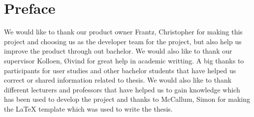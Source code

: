 \chapter*{Preface} %
\label{chap:preface}

We would like to thank our product owner Frantz, Christopher for making this project and choosing us as the developer team for the project, but also help us improve the product through out bachelor. We would also like to thank our supervisor Kolloen, Øivind for great help in academic writting. A big thanks to participants for user studies and other bachelor students that have helped us correct or shared information related to thesis. We would also like to thank different lecturers and professors that have helped us to gain knowledge which has been used to develop the project and thanks to McCallum, Simon for making the \LaTeX{} template which was used to write the thesis.
 
 